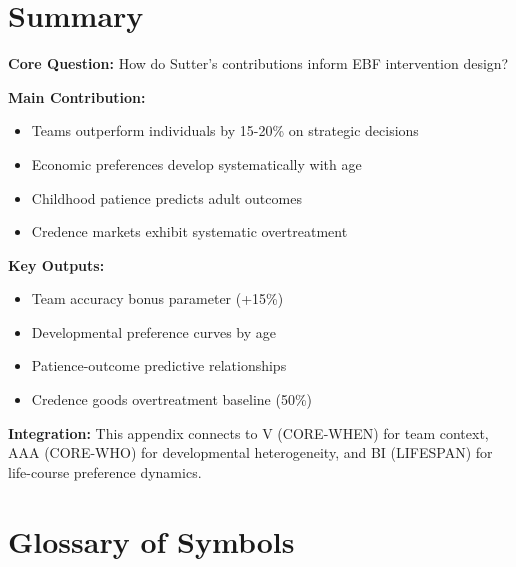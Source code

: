 \section{Summary}
\label{sec:sut-summary}

\begin{tcolorbox}[colback=green!10!white, colframe=green!75!black,
    title=\textbf{Appendix SUT: Summary}]

\textbf{Core Question:} How do Sutter's contributions inform EBF intervention design?

\textbf{Main Contribution:}
\begin{itemize}[nosep]
    \item Teams outperform individuals by 15-20\% on strategic decisions
    \item Economic preferences develop systematically with age
    \item Childhood patience predicts adult outcomes
    \item Credence markets exhibit systematic overtreatment
\end{itemize}

\textbf{Key Outputs:}
\begin{itemize}[nosep]
    \item Team accuracy bonus parameter (+15\%)
    \item Developmental preference curves by age
    \item Patience-outcome predictive relationships
    \item Credence goods overtreatment baseline (50\%)
\end{itemize}

\textbf{Integration:} This appendix connects to V (CORE-WHEN) for team context,
AAA (CORE-WHO) for developmental heterogeneity, and BI (LIFESPAN) for
life-course preference dynamics.

\end{tcolorbox}


\section{Glossary of Symbols}
\label{sec:sut-glossary}

